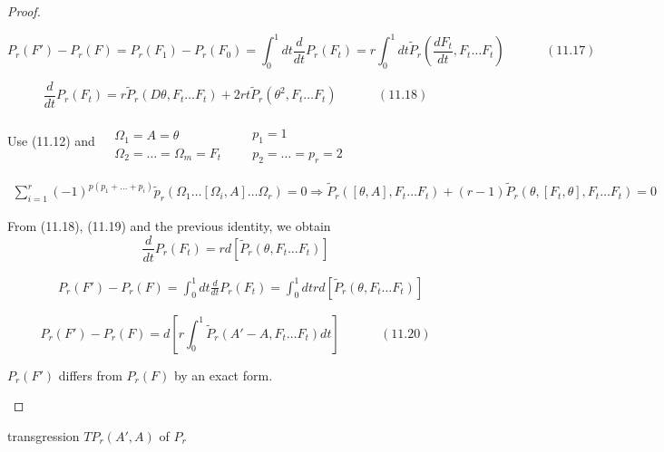 \documentclass[twoside]{amsart}
\begin{document}
\begin{proof}
\begin{enumerate}
\begin{equation}
  P_r(F') - P_r(F) = P_r(F_1) - P_r(F_0) = \int_0^1 dt \frac{d}{dt}P_r(F_t)=  r\int_0^1 dt \widetilde{P}_r\left( \frac{dF_t}{dt}, F_t \dots F_t\right) \quad \quad \quad \, (11.17)
\end{equation}

\begin{equation}
  \frac{d}{dt} P_r(F_t) = r \widetilde{P}_r( D\theta, F_t \dots F_t) + 2rt \widetilde{P}_r(\theta^2, F_t \dots F_t) \quad \quad \quad \, (11.18)
\end{equation}


Use (11.12) and $\begin{aligned} & \quad \\ 
  & \Omega_1 = A = \theta \\ 
  & \Omega_2 = \dots = \Omega_m = F_t \end{aligned}$ \quad \quad \, $\begin{aligned} & \quad \\ 
  & p_1 = 1 \\
  & p_2 = \dots = p_r = 2 \end{aligned}$ 

\[
\begin{gathered}
  \sum_{i=1}^r (-1)^{ p ( p_1 + \dots + p_i ) } \widetilde{p}_r( \Omega_1 \dots [\Omega_i , A ] \dots \Omega_r ) = 0 \Longrightarrow \widetilde{P}_r( [\theta , A ] , F_t \dots F_t) + (r-1) \widetilde{P}_r( \theta, [F_t, \theta]  , F_t \dots F_t) = 0 
\end{gathered}
\]

From (11.18), (11.19) and the previous identity, we obtain
\[
\frac{d}{dt} P_r(F_t) = rd[ \widetilde{P}_r(\theta, F_t \dots F_t) ]
\]

\[
\begin{aligned}
  & P_r(F') - P_r(F) = \int_0^1 dt \frac{d}{dt} P_r(F_t) = \int_0^1 dt r d[\widetilde{P}_r(\theta, F_t \dots F_t) ] 
\end{aligned} 
\]

\begin{equation}
   P_r(F') - P_r(F) = d \left[ r \int_0^1 \widetilde{P}_r(A'-A, F_t \dots F_t) dt \right] \quad \quad \quad \, (11.20)
\end{equation}

$P_r(F')$ differs from $P_r(F)$ by an exact form.  

\end{enumerate}
\end{proof}


transgression $TP_r(A',A)$ of $P_r$
\end{document}
